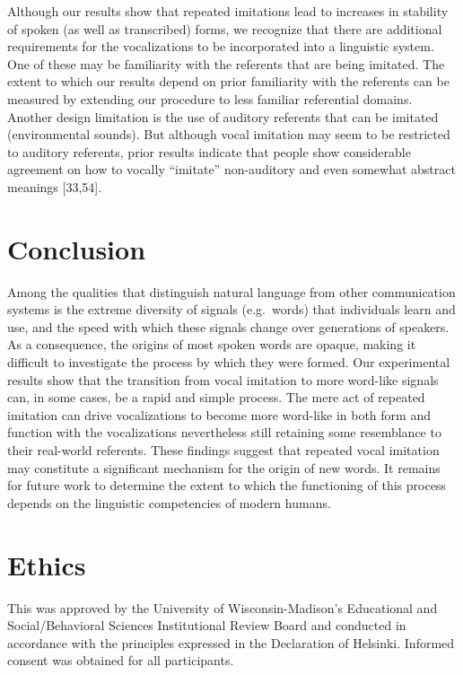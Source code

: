 \documentclass[english,floatsintext,man]{apa6}
\theoremstyle{definition}
\theoremstyle{definition}
\theoremstyle{definition}
\theoremstyle{remark}
\begin{document}
Although our results show that repeated imitations lead to increases in
stability of spoken (as well as transcribed) forms, we recognize that
there are additional requirements for the vocalizations to be
incorporated into a linguistic system. One of these may be familiarity
with the referents that are being imitated. The extent to which our
results depend on prior familiarity with the referents can be measured
by extending our procedure to less familiar referential domains. Another
design limitation is the use of auditory referents that can be imitated
(environmental sounds). But although vocal imitation may seem to be
restricted to auditory referents, prior results indicate that people
show considerable agreement on how to vocally \enquote{imitate}
non-auditory and even somewhat abstract meanings {[}33,54{]}.

\hypertarget{conclusion}{%
\section{Conclusion}\label{conclusion}}

Among the qualities that distinguish natural language from other
communication systems is the extreme diversity of signals (e.g.~words)
that individuals learn and use, and the speed with which these signals
change over generations of speakers. As a consequence, the origins of
most spoken words are opaque, making it difficult to investigate the
process by which they were formed. Our experimental results show that
the transition from vocal imitation to more word-like signals can, in
some cases, be a rapid and simple process. The mere act of repeated
imitation can drive vocalizations to become more word-like in both form
and function with the vocalizations nevertheless still retaining some
resemblance to their real-world referents. These findings suggest that
repeated vocal imitation may constitute a significant mechanism for the
origin of new words. It remains for future work to determine the extent
to which the functioning of this process depends on the linguistic
competencies of modern humans.

\hypertarget{ethics}{%
\section{Ethics}\label{ethics}}

This was approved by the University of Wisconsin-Madison's Educational
and Social/Behavioral Sciences Institutional Review Board and conducted
in accordance with the principles expressed in the Declaration of
Helsinki. Informed consent was obtained for all participants.
\end{document}
